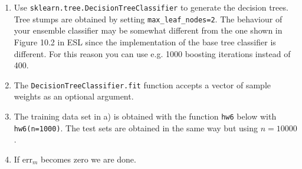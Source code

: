 \documentclass[11pt]{article}
\begin{document}
\begin{enumerate}
\def\labelenumi{\arabic{enumi})}
\item
  Use \texttt{sklearn.tree.DecisionTreeClassifier} to generate the
  decision trees. Tree stumps are obtained by setting
  \texttt{max\_leaf\_nodes=2}. The behaviour of your ensemble classifier
  may be somewhat different from the one shown in Figure 10.2 in ESL
  since the implementation of the base tree classifier is different. For
  this reason you can use e.g. 1000 boosting iterations instead of 400.
\item
  The \texttt{DecisionTreeClassifier.fit} function accepts a vector of
  sample weights as an optional argument.
\item
  The training data set in a) is obtained with the function \texttt{hw6}
  below with \texttt{hw6(n=1000)}. The test sets are obtained in the
  same way but using \(n=10000\).
\item
  If \(\text{err}_m\) becomes zero we are done.
\end{enumerate}
\end{document}
